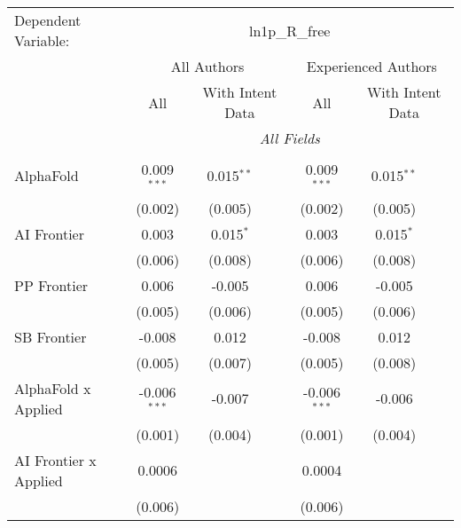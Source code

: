 \begingroup
\centering
\begin{tabular}{lcccccc}
   \tabularnewline \midrule \midrule
   Dependent Variable: & \multicolumn{6}{c}{ln1p\_R\_free}\\
 & \multicolumn{3}{c}{All Authors} & \multicolumn{3}{c}{Experienced Authors} \\
\cmidrule(lr){2-4} \cmidrule(lr){5-7}
 & \multicolumn{1}{c}{All} & \multicolumn{2}{c}{With Intent Data} & \multicolumn{1}{c}{All} & \multicolumn{2}{c}{With Intent Data} \\
\cmidrule(lr){2-2} \cmidrule(lr){3-4} \cmidrule(lr){5-5} \cmidrule(lr){6-7}
 & \multicolumn{6}{c}{\textit{All Fields}} \\ \\
   AlphaFold                    & 0.009$^{***}$  & 0.015$^{**}$ &              & 0.009$^{***}$  & 0.015$^{**}$ &   \\   
                                & (0.002)        & (0.005)      &              & (0.002)        & (0.005)      &   \\   
   AI Frontier                  & 0.003          & 0.015$^{*}$  &              & 0.003          & 0.015$^{*}$  &   \\   
                                & (0.006)        & (0.008)      &              & (0.006)        & (0.008)      &   \\   
   PP Frontier                  & 0.006          & -0.005       &              & 0.006          & -0.005       &   \\   
                                & (0.005)        & (0.006)      &              & (0.005)        & (0.006)      &   \\   
   SB Frontier                  & -0.008         & 0.012        &              & -0.008         & 0.012        &   \\   
                                & (0.005)        & (0.007)      &              & (0.005)        & (0.008)      &   \\   
   AlphaFold x Applied          & -0.006$^{***}$ & -0.007       &              & -0.006$^{***}$ & -0.006       &   \\   
                                & (0.001)        & (0.004)      &              & (0.001)        & (0.004)      &   \\   
   AI Frontier x Applied        & 0.0006         &              &              & 0.0004         &              &   \\   
                                & (0.006)        &              &              & (0.006)        &              &   \\   

\end{tabular}
